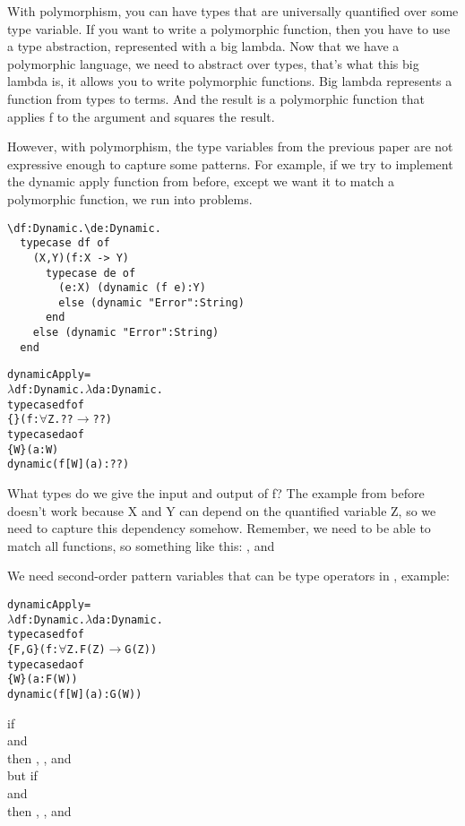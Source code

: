 \documentclass[12pt]{article}	%
\begin{document}
With polymorphism, you can have types that are universally quantified over some type variable. If you want to write a polymorphic function, then you have to use a type abstraction, represented with a big lambda. Now that we have a polymorphic language, we need to abstract over types, that's what this big lambda is, it allows you to write polymorphic functions. Big lambda represents a function from types to terms. And the result is a polymorphic function that applies f to the argument and squares the result.


However, with polymorphism, the type variables from the previous paper are not expressive enough to capture some patterns. For example, if we try to implement the dynamic apply function from before, except we want it to match a polymorphic function, we run into problems.

\begin{verbatim}
\df:Dynamic.\de:Dynamic.
  typecase df of
    (X,Y)(f:X -> Y)
      typecase de of
        (e:X) (dynamic (f e):Y)
        else (dynamic "Error":String)
      end
    else (dynamic "Error":String)
  end
\end{verbatim}
	\begin{alltt}
	dynamicApply = 
	  \(\lambda\)df:Dynamic.\(\lambda\)da:Dynamic.
	    typecase df of
	      \{\} (f:\(\forall\)Z.??\(\rightarrow\)??)
	        typecase da of
	          \{W\} (a:W)
	            dynamic( f[W](a):?? )
	\end{alltt}

What types do we give the input and output of f? The example from before doesn't work because X and Y can depend on the quantified variable Z, so we need to capture this dependency somehow. Remember, we need to be able to match all functions, so something like this: , and 

We need second-order pattern variables that can be type operators in \typecase, example:
	\begin{alltt}
	dynamicApply = 
	  \(\lambda\)df:Dynamic.\(\lambda\)da:Dynamic.
	    typecase df of
	      \{F,G\} (f:\(\forall\)Z.F(Z)\(\rightarrow\)G(Z))
	        typecase da of
	          \{W\} (a:F(W))
	            dynamic( f[W](a):G(W) )
	\end{alltt}
	if  \\
	and  \\
	then , , and  \\
	but if  \\
	and  \\
	then , , and  \\
\end{document}
